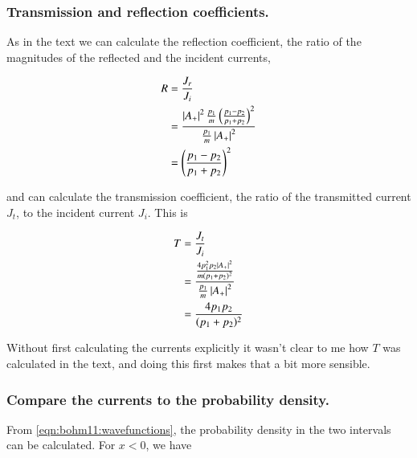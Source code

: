 
\subsubsection{Transmission and reflection coefficients. }

As in the text we can calculate the reflection coefficient, the ratio of the magnitudes of the reflected and the incident currents,

\begin{align*}
R
&= \frac{J_r}{J_i}  \\
&=
\frac{\left\lvert{ A_{+} }\right\rvert^2
\frac{ p_1 }{m }
\left( \frac{ p_1 - p_2 }{p_1 + p_2} \right)^2 }{
\frac{ p_1}{m}
\left\lvert{ A_{+} }\right\rvert^2 } \\
&=
\left( \frac{ p_1 - p_2 }{p_1 + p_2} \right)^2
\\
\end{align*}

and can calculate the transmission coefficient, the ratio of the transmitted current $J_t$, to the incident current $J_i$.  This is

\begin{align*}
T
&= \frac{J_t}{J_i} \\
&=
\frac{
\frac{ 4 p_1^2 p_2 \left\lvert{ A_{+} }\right\rvert^2}{m (p_1 + p_2)^2}
}
{
\frac{ p_1}{m} \left\lvert{ A_{+} }\right\rvert^2
} \\
&=
\frac{ 4 p_1 p_2 }{ (p_1 + p_2)^2}
\end{align*}

Without first calculating the currents explicitly it wasn't clear to me how $T$ was calculated in the text, and doing this first
makes that a bit more sensible.

\subsubsection{Compare the currents to the probability density. }

From \ref{eqn:bohm11:wavefunctions}, the probability density in the two intervals
can be calculated.  For $x<0$, we have

